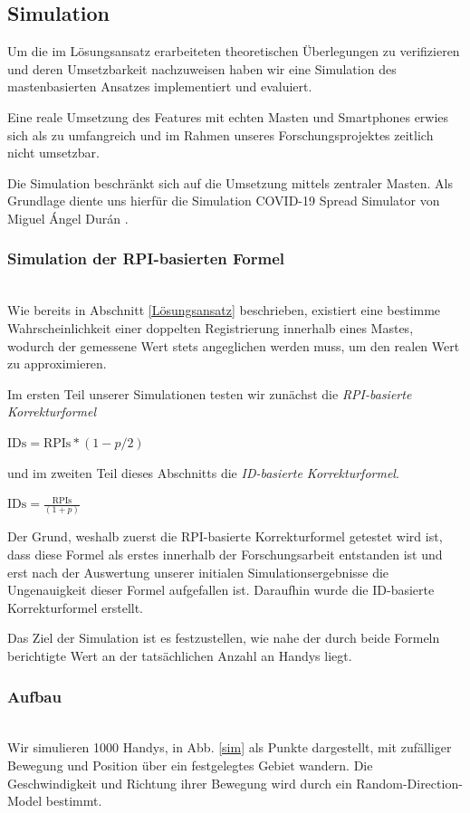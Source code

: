\documentclass[conference,compsoc]{IEEEtran}
\begin{document}
\subsection{Simulation}

Um die im Lösungsansatz erarbeiteten theoretischen Überlegungen zu verifizieren und deren Umsetzbarkeit nachzuweisen haben wir eine Simulation des mastenbasierten Ansatzes implementiert und evaluiert.

Eine reale Umsetzung des Features mit echten Masten und Smartphones erwies sich als zu umfangreich und im Rahmen unseres Forschungsprojektes zeitlich nicht umsetzbar.

Die Simulation beschränkt sich auf die Umsetzung mittels zentraler Masten.
Als Grundlage diente uns hierfür die Simulation \glqq COVID-19 Spread Simulator\grqq{} von Miguel Ángel Durán \cite{Simulation}.\\

\subsubsection{Simulation der RPI-basierten Formel}
\text{}\\
Wie bereits in Abschnitt \ref{Lösungsansatz} beschrieben, existiert eine bestimme Wahrscheinlichkeit einer doppelten Registrierung innerhalb eines Mastes, 
wodurch der gemessene Wert stets angeglichen werden muss, um den realen Wert zu approximieren.

Im ersten Teil unserer Simulationen testen wir zunächst die \textit{RPI-basierte Korrekturformel}\\
\centerline{}
\centerline{$\text{IDs} = \text{RPIs} * (1-p/2)$}
\centerline{}
und im zweiten Teil dieses Abschnitts die \textit{ID-basierte Korrekturformel}.\\
\centerline{}
\centerline{$\text{IDs} = \frac{\text{RPIs}}{(1+p)}$}
\centerline{}
Der Grund, weshalb zuerst die RPI-basierte Korrekturformel getestet wird ist, 
dass diese Formel als erstes innerhalb der Forschungsarbeit entstanden ist und erst nach der Auswertung unserer initialen Simulationsergebnisse die Ungenauigkeit dieser Formel aufgefallen ist.
Daraufhin wurde die ID-basierte Korrekturformel erstellt. 

Das Ziel der Simulation ist es festzustellen, wie nahe der durch beide Formeln berichtigte Wert an der tatsächlichen Anzahl an Handys liegt.\\

\subsubsection{Aufbau}
\text{}\\
Wir simulieren 1000 Handys, in Abb. \ref{sim} als Punkte dargestellt, mit zufälliger Bewegung und Position über ein festgelegtes Gebiet wandern. 
Die Geschwindigkeit und Richtung ihrer Bewegung wird durch ein Random-Direction-Model bestimmt.
\end{document}
